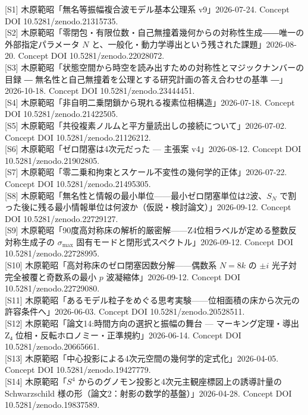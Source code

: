 \documentclass[
  a4paper,
]{ltjsarticle}
\begin{document}
{[}S1{]} 木原範昭「無名等振幅複合波モデル基本公理系 v9」2026-07-24.
Concept DOI 10.5281/zenodo.21315735.\\
{[}S2{]}
木原範昭「零閉包・有限位数・自己無撞着幾何からの対称性生成――唯一の外部指定パラメータ
\(N\) と、一般化・動力学導出という残された課題」2026-08-20. Concept DOI
10.5281/zenodo.22028072.\\
{[}S3{]}
木原範昭「状態空間から時空を読み出すための対称性とマジックナンバーの目録
― 無名性と自己無撞着を公理とする研究計画の答え合わせの基準
―」2026-10-18. Concept DOI 10.5281/zenodo.23444451.\\
{[}S4{]} 木原範昭「非自明二乗閉鎖から現れる複素位相構造」2026-07-18.
Concept DOI 10.5281/zenodo.21422505.\\
{[}S5{]}
木原範昭「共役複素ノルムと平方量読出しの接続について」2026-07-02.
Concept DOI 10.5281/zenodo.21126212.\\
{[}S6{]} 木原範昭「ゼロ閉塞は4次元だった --- 主張案 v4」2026-08-12.
Concept DOI 10.5281/zenodo.21902805.\\
{[}S7{]}
木原範昭「零二乗和拘束とスケール不変性の幾何学的正体」2026-07-22.
Concept DOI 10.5281/zenodo.21495305.\\
{[}S8{]}
木原範昭「無名性と情報の最小単位------最小ゼロ閉塞単位は2波、\(S_N\)
で割った後に残る最小情報単位は何波か（仮説・検討論文）」2026-09-12.
Concept DOI 10.5281/zenodo.22729127.\\
{[}S9{]}
木原範昭「90度高対称床の解析的厳密解------Z4位相ラベルが定める整数反対称生成子の
\(\sigma_{\max}\) 固有モードと閉形式スペクトル」2026-09-12. Concept DOI
10.5281/zenodo.22728995.\\
{[}S10{]} 木原範昭「高対称床のゼロ閉塞因数分解------偶数系 \(N=8k\) の
\(\pm i\) 光子対完全被覆と奇数系の最小 \(p\) 波凝縮体」2026-09-12.
Concept DOI 10.5281/zenodo.22729080.\\
{[}S11{]}
木原範昭「あるモデル粒子をめぐる思考実験------位相面積の床から次元の許容条件へ」2026-06-03.
Concept DOI 10.5281/zenodo.20528511.\\
{[}S12{]} 木原範昭「論文14:時間方向の選択と振幅の舞台 ---
マーキング定理・導出 Z₄ 位相・反転ホロノミー・正準規約」2026-06-14.
Concept DOI 10.5281/zenodo.20665661.\\
{[}S13{]} 木原範昭「中心投影による4次元空間の幾何学的定式化」2026-04-05.
Concept DOI 10.5281/zenodo.19427779.\\
{[}S14{]} 木原範昭「\(S^4\)
からのグノモン投影と4次元主観座標図上の誘導計量の Schwarzschild
様の形（論文2：射影の数学的基盤）」2026-04-28. Concept DOI
10.5281/zenodo.19837589.\\
\end{document}
